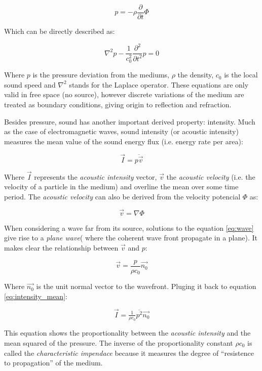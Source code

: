 \[ p =  -\rho \frac{\partial}{\partial t}\Phi \]

Which can be directly described as:

\begin{equation} \label{eq:wave}
\nabla^2 p - \frac{1}{c^2_0}\frac{\partial^2}{\partial t^2} p = 0
\end{equation} 
 
Where $p$ is the pressure deviation from the mediums, $\rho$ the density, $c_0$
is the local sound speed and $\nabla^2$ stands for the Laplace operator. These equations are
only valid in free space (no source), however discrete variations of the medium
are treated as boundary conditions, giving origin to reflection and refraction.

Besides pressure, sound has another important derived property: intensity. Much
as the case of electromagnetic waves, sound intensity (or acoustic intensity)
measures the mean value of the sound energy flux (i.e. energy rate
per area):

\begin{equation}\label{eq:intensity_mean}
\vec{I} = \overline{p\vec{v}}
\end{equation}

Where $\vec{I}$ represents the \textit{acoustic intensity} vector, $\vec{v}$ the
\textit{acoustic velocity} (i.e. the velocity of a particle in the medium) and
overline the mean over some time period. The \textit{acoustic
velocity} can also be derived from the velocity potencial $\Phi$ as:

\[ \vec{v} = \nabla \Phi\]

When considering a wave far from its source, solutions to the equation
\ref{eq:wave} give rise to a \textit{plane wave}( where the coherent wave front
propagate in a plane). It makes clear the relationship between $\vec{v}$ and
$p$:

\[ \vec{v} = \frac{p}{\rho c_0} \vec{n_0} \]

Where $\vec{n_0}$ is the unit normal vector to the wavefront. Pluging it back to
equation \ref{eq:intensity_mean}:

\begin{equation}\label{eq:intensity_pressure}
\vec{I} = \tfrac{1}{\rho c_0} \overline{p^2} \vec{n_0}
\end{equation}

This equation shows the proportionality between the \textit{acoustic
intensity} and the mean squared of the pressure. The inverse of the
proportionality constant $\rho c_0$ is called the \textit{characteristic
impendace} because it measures the degree of ``resistence to propagation'' of
the medium.

